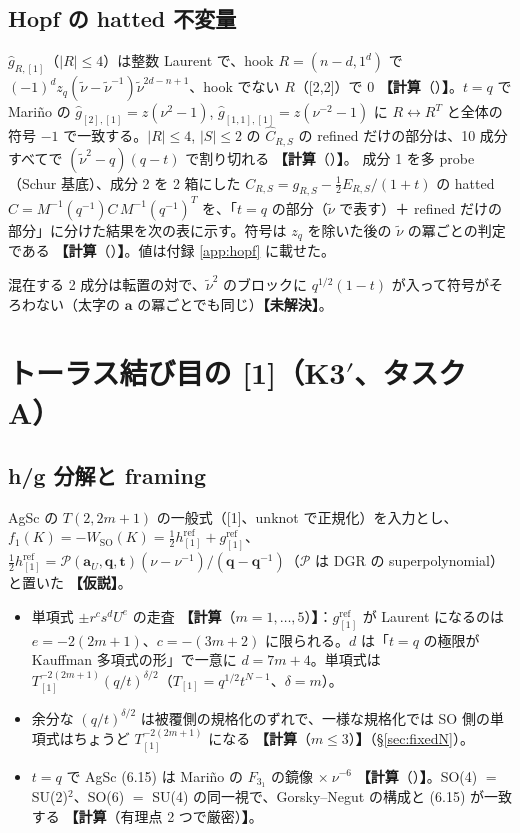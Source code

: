 \documentclass[a4paper,10pt]{ltjsarticle}
\newcommand{\ba}{\bm{a}}
\newcommand{\bq}{\bm{q}}
\newcommand{\bt}{\bm{t}}
\newcommand{\tnu}{\tilde\nu}
\newcommand{\comp}[1]{\textbf{【計算}\if\relax\detokenize{#1}\relax\else（#1）\fi\textbf{】}}
\newcommand{\hyp}{\textbf{【仮説】}}
\newcommand{\open}{\textbf{【未解決】}}
\begin{document}
\subsection{Hopf の hatted 不変量}
$\hat g_{R,[1]}$（$|R| \le 4$）は整数 Laurent で、hook $R = (n - d, 1^d)$ で $(-1)^d z_q (\tnu - \tnu^{-1}) \tnu^{2d - n + 1}$、hook でない $R$（[2,2]）で 0 \comp{}。$t = q$ で Mariño の $\hat g_{[2],[1]} = z(\nu^2 - 1)$, $\hat g_{[1,1],[1]} = z(\nu^{-2} - 1)$ に $R \leftrightarrow R^T$ と全体の符号 $-1$ で一致する。$|R| \le 4$, $|S| \le 2$ の $\hat C_{R,S}$ の refined だけの部分は、10 成分すべてで $(\tnu^2 - q)(q - t)$ で割り切れる \comp{}。
成分 1 を多 probe（Schur 基底）、成分 2 を 2 箱にした $C_{R,S} = g_{R,S} - \tfrac12 E_{R,S}/(1+t)$ の hatted $\hat C = M^{-1}(q^{-1}) C\, M^{-1}(q^{-1})^T$ を、「$t = q$ の部分（$\tnu$ で表す）＋ refined だけの部分」に分けた結果を次の表に示す。符号は $z_q$ を除いた後の $\tnu$ の冪ごとの判定である \comp{}。値は付録 \ref{app:hopf} に載せた。

混在する 2 成分は転置の対で、$\tnu^2$ のブロックに $q^{1/2}(1 - t)$ が入って符号がそろわない（太字の $\ba$ の冪ごとでも同じ）\open。

\section{トーラス結び目の [1]（K3$'$、タスク A）}
\subsection{h/g 分解と framing}
AgSc の $T(2,2m+1)$ の一般式（[1]、unknot で正規化）を入力とし、$f_1(K) = -W_{\mathrm{SO}}(K) = \tfrac12 h^{\mathrm{ref}}_{[1]} + g^{\mathrm{ref}}_{[1]}$、$\tfrac12 h^{\mathrm{ref}}_{[1]} = \mathcal{P}(\ba_U, \bq, \bt) (\nu - \nu^{-1})/(\bq - \bq^{-1})$（$\mathcal P$ は DGR の superpolynomial）と置いた \hyp。
\begin{itemize}
\item 単項式 $\pm r^c s^d U^e$ の走査 \comp{$m = 1, \dots, 5$}：$g^{\mathrm{ref}}_{[1]}$ が Laurent になるのは $e = -2(2m+1)$、$c = -(3m+2)$ に限られる。$d$ は「$t = q$ の極限が Kauffman 多項式の形」で一意に $d = 7m + 4$。単項式は $T_{[1]}^{-2(2m+1)} (q/t)^{\delta/2}$（$T_{[1]} = q^{1/2} t^{N-1}$、$\delta = m$）。
\item 余分な $(q/t)^{\delta/2}$ は被覆側の規格化のずれで、一様な規格化では SO 側の単項式はちょうど $T_{[1]}^{-2(2m+1)}$ になる \comp{$m \le 3$}（§\ref{sec:fixedN}）。
\item $t = q$ で AgSc (6.15) は Mariño の $F_{3_1}$ の鏡像 $\times\ \nu^{-6}$ \comp{}。SO(4) $=$ SU(2)$^2$、SO(6) $=$ SU(4) の同一視で、Gorsky--Negut の構成と (6.15) が一致する \comp{有理点 2 つで厳密}。
\end{itemize}
\end{document}
